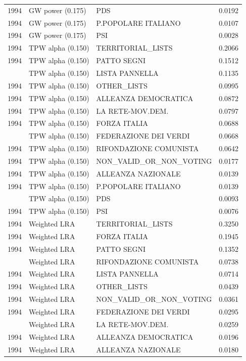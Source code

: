 \begin{longtable}[t]{rllr}
1994 & GW power (0.175) & PDS & 0.0192\\
1994 & GW power (0.175) & P.POPOLARE ITALIANO & 0.0107\\
1994 & GW power (0.175) & PSI & 0.0028\\
1994 & TPW alpha (0.150) & TERRITORIAL\_LISTS & 0.2066\\
1994 & TPW alpha (0.150) & PATTO SEGNI & 0.1512\\
\addlinespace
1994 & TPW alpha (0.150) & LISTA PANNELLA & 0.1135\\
1994 & TPW alpha (0.150) & OTHER\_LISTS & 0.0995\\
1994 & TPW alpha (0.150) & ALLEANZA DEMOCRATICA & 0.0872\\
1994 & TPW alpha (0.150) & LA RETE-MOV.DEM. & 0.0797\\
1994 & TPW alpha (0.150) & FORZA ITALIA & 0.0688\\
\addlinespace
1994 & TPW alpha (0.150) & FEDERAZIONE DEI VERDI & 0.0668\\
1994 & TPW alpha (0.150) & RIFONDAZIONE COMUNISTA & 0.0642\\
1994 & TPW alpha (0.150) & NON\_VALID\_OR\_NON\_VOTING & 0.0177\\
1994 & TPW alpha (0.150) & ALLEANZA NAZIONALE & 0.0139\\
1994 & TPW alpha (0.150) & P.POPOLARE ITALIANO & 0.0139\\
\addlinespace
1994 & TPW alpha (0.150) & PDS & 0.0093\\
1994 & TPW alpha (0.150) & PSI & 0.0076\\
1994 & Weighted LRA & TERRITORIAL\_LISTS & 0.3250\\
1994 & Weighted LRA & FORZA ITALIA & 0.1945\\
1994 & Weighted LRA & PATTO SEGNI & 0.1352\\
\addlinespace
1994 & Weighted LRA & RIFONDAZIONE COMUNISTA & 0.0738\\
1994 & Weighted LRA & LISTA PANNELLA & 0.0714\\
1994 & Weighted LRA & OTHER\_LISTS & 0.0439\\
1994 & Weighted LRA & NON\_VALID\_OR\_NON\_VOTING & 0.0361\\
1994 & Weighted LRA & FEDERAZIONE DEI VERDI & 0.0295\\
\addlinespace
1994 & Weighted LRA & LA RETE-MOV.DEM. & 0.0259\\
1994 & Weighted LRA & ALLEANZA DEMOCRATICA & 0.0196\\
1994 & Weighted LRA & ALLEANZA NAZIONALE & 0.0180\\

\end{longtable}
